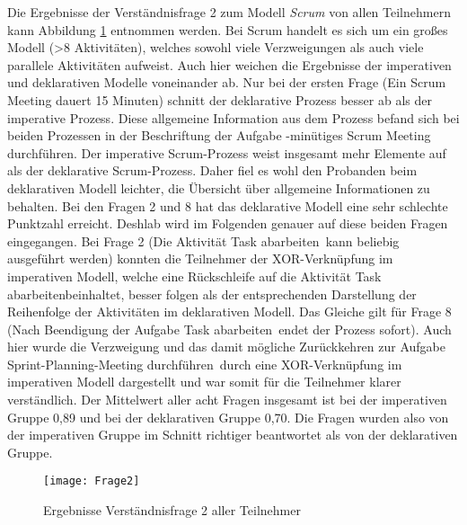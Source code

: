 Die Ergebnisse der Verständnisfrage 2 zum Modell \textit{Scrum} von allen Teilnehmern kann Abbildung \ref{fig:Frage2} entnommen werden.  Bei Scrum handelt es sich um ein großes Modell (>8 Aktivitäten), welches sowohl viele Verzweigungen als auch viele parallele Aktivitäten aufweist. Auch hier weichen die Ergebnisse der imperativen und deklarativen Modelle voneinander ab.\newline
Nur bei der ersten Frage (\grqq Ein Scrum Meeting dauert 15 Minuten\grqq) schnitt der deklarative Prozess besser ab als der imperative Prozess. Diese allgemeine Information aus dem Prozess befand sich bei beiden Prozessen in der Beschriftung der Aufgabe -minütiges Scrum Meeting durchführen\grqq. Der imperative Scrum-Prozess weist insgesamt mehr Elemente auf als der deklarative Scrum-Prozess. Daher fiel es wohl den Probanden beim deklarativen Modell leichter, die Übersicht über allgemeine Informationen zu behalten.\newline
Bei den Fragen 2 und 8 hat das deklarative Modell eine sehr schlechte Punktzahl erreicht. Deshlab wird im Folgenden genauer auf diese beiden Fragen eingegangen. Bei Frage 2 (\grqq Die Aktivität \grqq Task abarbeiten\grqq \ kann beliebig ausgeführt werden\grqq) konnten die Teilnehmer der XOR-Verknüpfung im imperativen Modell, welche eine Rückschleife auf die Aktivität \grqq Task abarbeiten\grqq beinhaltet, besser folgen als der entsprechenden Darstellung der Reihenfolge der Aktivitäten im deklarativen Modell. \newline
Das Gleiche gilt für Frage 8 (\grqq Nach Beendigung der Aufgabe \grqq Task abarbeiten\grqq \ endet der Prozess sofort\grqq). Auch hier wurde die Verzweigung und das damit mögliche Zurückkehren zur Aufgabe \grqq Sprint-Planning-Meeting durchführen\grqq \ durch eine XOR-Verknüpfung im imperativen Modell dargestellt und war somit für die Teilnehmer klarer verständlich.\newline
Der Mittelwert aller acht Fragen insgesamt ist bei der imperativen Gruppe 0,89 und bei der deklarativen Gruppe 0,70. Die Fragen wurden also von der imperativen Gruppe im Schnitt richtiger beantwortet als von der deklarativen Gruppe.\newline


\begin{figure}[htp]
\begin{center}
  \texttt{[image: Frage2]} %
  \caption{Ergebnisse Verständnisfrage 2 aller Teilnehmer}
  \label{fig:Frage2}
\end{center}
\end{figure}

